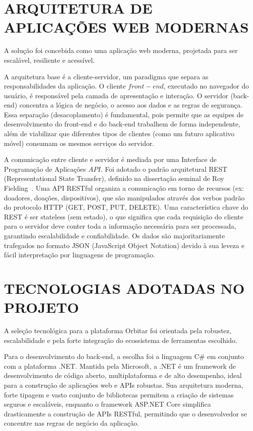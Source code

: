 \documentclass[
	12pt,				%
	openright,			%
	oneside,			%
	a4paper,			%
	english,			%
	brazil				%
	]{abntex2}
\theoremstyle{definition}
\begin{document}
\section[ARQUITETURA DE APLICAÇÕES WEB MODERNAS]{ARQUITETURA DE APLICAÇÕES WEB MODERNAS}

A solução foi concebida como uma aplicação web moderna, projetada para ser escalável, resiliente e acessível.

A arquitetura base é a cliente-servidor, um paradigma que separa as responsabilidades da aplicação. O cliente \(front-end\), executado no navegador do usuário, é responsável pela camada de apresentação e interação. O servidor (back-end) concentra a lógica de negócio, o acesso aos dados e as regras de segurança. Essa separação (desacoplamento) é fundamental, pois permite que as equipes de desenvolvimento do front-end e do back-end trabalhem de forma independente, além de viabilizar que diferentes tipos de clientes (como um futuro aplicativo móvel) consumam os mesmos serviços do servidor.

A comunicação entre cliente e servidor é mediada por uma Interface de Programação de Aplicações \(API\). Foi adotado o padrão arquitetural REST (Representational State Transfer), definido na dissertação seminal de Roy Fielding~\cite{fielding2000}. Uma API RESTful organiza a comunicação em torno de recursos (ex: doadores, doações, dispositivos), que são manipulados através dos verbos padrão do protocolo HTTP (GET, POST, PUT, DELETE). Uma característica chave do REST é ser stateless (sem estado), o que significa que cada requisição do cliente para o servidor deve conter toda a informação necessária para ser processada, garantindo escalabilidade e confiabilidade. Os dados são majoritariamente trafegados no formato JSON (JavaScript Object Notation) devido à sua leveza e fácil interpretação por linguagens de programação.

\section[TECNOLOGIAS ADOTADAS NO PROJETO]{TECNOLOGIAS ADOTADAS NO PROJETO}

A seleção tecnológica para a plataforma Orbitar foi orientada pela robustez, escalabilidade e pela forte integração do ecossistema de ferramentas escolhido.

Para o desenvolvimento do back-end, a escolha foi a linguagem C\# em conjunto com a plataforma .NET. Mantida pela Microsoft, a .NET é um framework de desenvolvimento de código aberto, multiplataforma e de alto desempenho, ideal para a construção de aplicações web e APIs robustas. Sua arquitetura moderna, forte tipagem e vasto conjunto de bibliotecas permitem a criação de sistemas seguros e escaláveis, enquanto o framework ASP.NET Core simplifica drasticamente a construção de APIs RESTful, permitindo que o desenvolvedor se concentre nas regras de negócio da aplicação.
\end{document}
